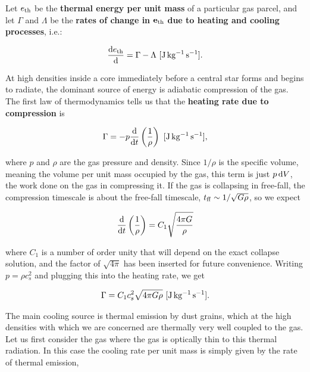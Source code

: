 \documentclass[a4paper,10pt]{article}
\begin{document}
{\noindent}Let $e_{\rm th}$ be the \textbf{thermal energy per unit mass} of a particular gas parcel, and let $\Gamma$ and $\Lambda$ be the \textbf{rates of change in} $\mathbf{e_{\rm th}}$ \textbf{due to heating and cooling processes}, i.e.:

\begin{align*}
    \frac{{\rm d}e_{\rm th}}{{\rm d}} = \Gamma - \Lambda ~ [{\rm J\,kg^{-1}\,s^{-1}}].
\end{align*}

{\noindent}At high densities inside a core immediately before a central star forms and begins to radiate, the dominant source of energy is adiabatic compression of the gas. The first law of thermodynamics tells us that the \textbf{heating rate due to compression} is

\begin{align*}
    \Gamma = -p \frac{{\rm d}}{{\rm d}t} \left(\frac{1}{\rho}\right) ~ [{\rm J\,kg^{-1}\,s^{-1}}],
\end{align*}

{\noindent}where $p$ and $\rho$ are the gas pressure and density. Since $1/\rho$ is the specific volume, meaning the volume per unit mass occupied by the gas, this term is just $p\,{\rm d}V$, the work done on the gas in compressing it. If the gas is collapsing in free-fall, the compression timescale is about the free-fall timescale, $t_{\rm ff} \sim 1/\sqrt{G\rho}$, so we expect 

\begin{align*}
    \frac{{\rm d}}{{\rm d}t} \left(\frac{1}{\rho}\right) = C_1 \sqrt{\frac{4\pi G}{\rho}} 
\end{align*}

{\noindent}where $C_1$ is a number of order unity that will depend on the exact collapse solution, and the factor of $\sqrt{4\pi}$ has been inserted for future convenience. Writing $p=\rho c_s^2$ and plugging this into the heating rate, we get

\begin{align*}
    \Gamma = C_1c_s^2 \sqrt{4\pi G\rho} ~ [{\rm J\,kg^{-1}\,s^{-1}}].
\end{align*}

{\noindent}The main cooling source is thermal emission by dust grains, which at the high densities with which we are concerned are thermally very well coupled to the gas. Let us first consider the gas where the gas is optically thin to this thermal radiation. In this case the cooling rate per unit mass is simply given by the rate of thermal emission,
\end{document}

